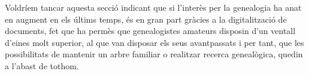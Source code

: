     Voldríem tancar aquesta secció indicant que si l'interès per la genealogia ha anat en augment en els últims temps, és en gran part gràcies a la digitalització de docu\-ments, fet que ha permès que genealogistes amateurs disposin d’un ventall d’eines molt superior, al que van disposar els seus avantpassats i per tant, que les possibilitats de mantenir un arbre familiar o realitzar recerca genealògica, quedin a l'abast de tothom.
